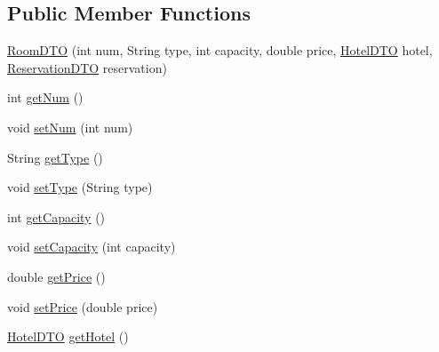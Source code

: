 \subsection*{Public Member Functions}
\begin{DoxyCompactItemize}
\item 
\mbox{\hyperlink{classbspq18__e4_1_1_gestion_hotelera_1_1server_1_1dto_1_1_room_d_t_o_a3347f4ea4138cbd19f86d952272abcb9}{Room\+D\+TO}} (int num, String type, int capacity, double price, \mbox{\hyperlink{classbspq18__e4_1_1_gestion_hotelera_1_1server_1_1dto_1_1_hotel_d_t_o}{Hotel\+D\+TO}} hotel, \mbox{\hyperlink{classbspq18__e4_1_1_gestion_hotelera_1_1server_1_1dto_1_1_reservation_d_t_o}{Reservation\+D\+TO}} reservation)
\item 
int \mbox{\hyperlink{classbspq18__e4_1_1_gestion_hotelera_1_1server_1_1dto_1_1_room_d_t_o_a2c491a95730ccf7305644e27abfa770e}{get\+Num}} ()
\item 
void \mbox{\hyperlink{classbspq18__e4_1_1_gestion_hotelera_1_1server_1_1dto_1_1_room_d_t_o_a2c0134f26f29e85300c2b62af4746fd7}{set\+Num}} (int num)
\item 
String \mbox{\hyperlink{classbspq18__e4_1_1_gestion_hotelera_1_1server_1_1dto_1_1_room_d_t_o_a6705cab06395b3bf17a009afaeddc179}{get\+Type}} ()
\item 
void \mbox{\hyperlink{classbspq18__e4_1_1_gestion_hotelera_1_1server_1_1dto_1_1_room_d_t_o_a6c43ea6bd66434f07cde0f940e65f9f8}{set\+Type}} (String type)
\item 
int \mbox{\hyperlink{classbspq18__e4_1_1_gestion_hotelera_1_1server_1_1dto_1_1_room_d_t_o_aa8ea25f1e1c45d7ce782cb4122120ccf}{get\+Capacity}} ()
\item 
void \mbox{\hyperlink{classbspq18__e4_1_1_gestion_hotelera_1_1server_1_1dto_1_1_room_d_t_o_aa9ff42dcfb4832c9214bce70bfdbefd6}{set\+Capacity}} (int capacity)
\item 
double \mbox{\hyperlink{classbspq18__e4_1_1_gestion_hotelera_1_1server_1_1dto_1_1_room_d_t_o_ac41c83fbcfd974010a586b51c3dd421e}{get\+Price}} ()
\item 
void \mbox{\hyperlink{classbspq18__e4_1_1_gestion_hotelera_1_1server_1_1dto_1_1_room_d_t_o_a9bd604378a7201db712efbdfa56d66d3}{set\+Price}} (double price)
\item 
\mbox{\hyperlink{classbspq18__e4_1_1_gestion_hotelera_1_1server_1_1dto_1_1_hotel_d_t_o}{Hotel\+D\+TO}} \mbox{\hyperlink{classbspq18__e4_1_1_gestion_hotelera_1_1server_1_1dto_1_1_room_d_t_o_adc542a560db652e578451025d28726b3}{get\+Hotel}} ()
\item 

\end{DoxyCompactItemize}
